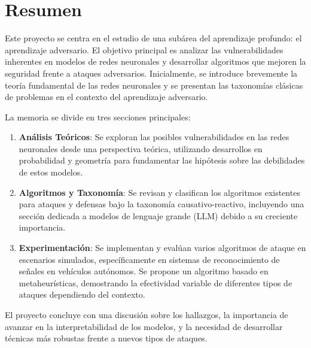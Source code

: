 %


\chapter{Resumen}



Este proyecto se centra en el estudio de una subárea del aprendizaje profundo: el aprendizaje adversario. El objetivo principal es analizar las vulnerabilidades inherentes en modelos de redes neuronales y desarrollar algoritmos que mejoren la seguridad frente a ataques adversarios. Inicialmente, se introduce brevemente la teoría fundamental de las redes neuronales y se presentan las taxonomías clásicas de problemas en el contexto del aprendizaje adversario.

La memoria se divide en tres secciones principales:
\begin{enumerate}
    \item \textbf{Análisis Teóricos}: Se exploran las posibles vulnerabilidades en las redes neuronales desde una perspectiva teórica, utilizando desarrollos en probabilidad y geometría para fundamentar las hipótesis sobre las debilidades de estos modelos.
    \item \textbf{Algoritmos y Taxonomía}: Se revisan y clasifican los algoritmos existentes para ataques y defensas bajo la taxonomía causativo-reactivo, incluyendo una sección dedicada a modelos de lenguaje grande (LLM) debido a su creciente importancia.
    \item \textbf{Experimentación}: Se implementan y evalúan varios algoritmos de ataque en escenarios simulados, específicamente en sistemas de reconocimiento de señales en vehículos autónomos. Se propone un algoritmo basado en metaheurísticas, demostrando la efectividad variable de diferentes tipos de ataques dependiendo del contexto.
\end{enumerate}

El proyecto concluye con una discusión sobre los hallazgos, la importancia de avanzar en la interpretabilidad de los modelos, y la necesidad de desarrollar técnicas más robustas frente a nuevos tipos de ataques.


\endinput
